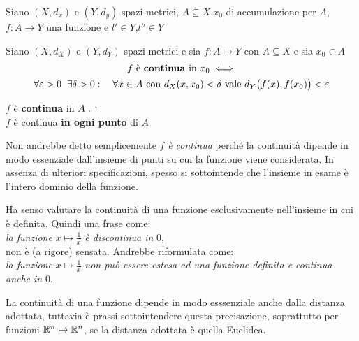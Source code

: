 \begin{proposition}
	Siano $(X,d_x)$ e $(Y,d_y)$ spazi metrici, $A\subseteq{X}$,$x_0$ di accumulazione per $A$, $f:A\rightarrow{Y}$ una funzione e $l'\in{Y}$,$l''\in{Y}$
\end{proposition}

\begin{definition}
	\label{def:funz_cont}
	Siano $(X,d_X)$ e $(Y,d_Y)$ spazi metrici e sia $f: A \mapsto Y$ con $A \subseteq X$ e sia $x_0 \in A$
	\begin{equation*}
		\begin{gathered}
			f \text{ è \textbf{continua} in } x_0 \iff\\
			\forall \varepsilon > 0\;\;\exists \delta > 0:\quad \forall x \in A \text{ con } d_X(x,x_0)<\delta \text{ vale } d_Y \bigl(f(x),f(x_0)\bigr) < \varepsilon
		\end{gathered}
	\end{equation*}

	\begin{center}
		$f$ è \textbf{continua} in $A\rightleftharpoons$\\
		$f$ è continua \textbf{in ogni punto} di $A$
	\end{center}
	\begin{note}
		Non andrebbe detto semplicemente $f$ \textit{è continua} perché la continuità dipende in modo essenziale dall'insieme di punti su cui la funzione viene considerata. In assenza di ulteriori specificazioni, spesso si sottointende che l'insieme in esame è l'intero dominio della funzione.
	\end{note}
	\begin{note}
		Ha senso valutare la continuità di una funzione esclusivamente nell'insieme in cui è definita. Quindi una frase come:\\
		\textit{la funzione} $x \mapsto \frac{1}{x}$ \textit{è discontinua in} $0$,\\
		non è (a rigore) sensata. Andrebbe riformulata come:\\
		\textit{la funzione} $x \mapsto \frac{1}{x}$ \textit{non può essere estesa ad una funzione definita e continua anche in} $0$.
	\end{note}
	\begin{note}
		La continuità di una funzione dipende in modo esssenziale anche dalla distanza adottata, tuttavia è prassi sottointendere questa precisazione, soprattutto per funzioni $\mathbb{R}^n \mapsto \mathbb{R}^n$, se la distanza adottata è quella Euclidea.
	\end{note}
\end{definition}

